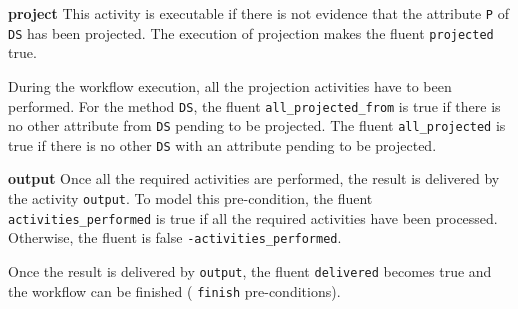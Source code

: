 %


\vspace*{0.25cm}
\textbf{project} This activity is executable if there is not evidence that the attribute \texttt{P} of \texttt{DS} has been projected. The execution of projection makes the fluent \texttt{projected} true.
               
%


\vspace*{0.25cm}
During the workflow execution, all the projection activities have to been performed. For the method \texttt{DS}, the fluent \texttt{all\_projected\_from} is true if there is no other attribute from \texttt{DS} pending to be projected. The fluent \texttt{all\_projected} is true if there is no other \texttt{DS} with an attribute pending to be projected.
                
%


\vspace*{0.25cm}                  
\textbf{output} Once all the required activities are performed, the result is delivered by the activity \texttt{output}. To model this pre-condition, the fluent \texttt{activities\_performed} is true if all the required activities have been processed. Otherwise, the fluent is false \texttt{-activities\_performed}.

%


\vspace*{0.25cm}
Once the result is delivered by \texttt{output}, the fluent \texttt{delivered} becomes true and the workflow can be finished (\cf{} \texttt{finish} pre-conditions).

%






